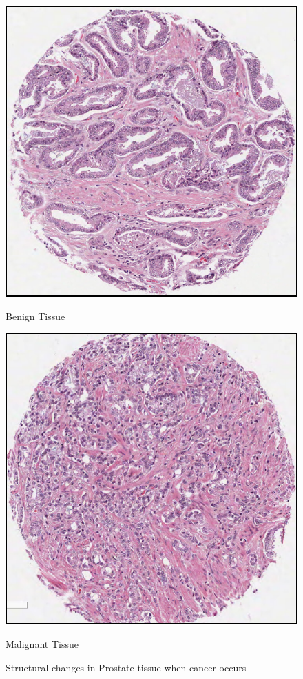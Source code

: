 \begin{figure}[!htb]
\centering
\begin{minipage}[b]{.48\linewidth}
  \centering
  \centerline{\includegraphics[scale=0.3]{figs/tissue_structure2.png}}
  \centerline{{Benign Tissue}\label{fig:tissue_structure2}}\medskip
\end{minipage}
\hfill
\begin{minipage}[b]{0.48\linewidth}
  \centering
  \centerline{\includegraphics[scale=0.3]{figs/tissue_structure3.png}}
  \centerline{{Malignant Tissue}\label{fig:tissue_structure2}}\medskip
\end{minipage}
\caption{Structural changes in Prostate tissue when cancer occurs}
\label{fig:tissue_types}
\end{figure}

